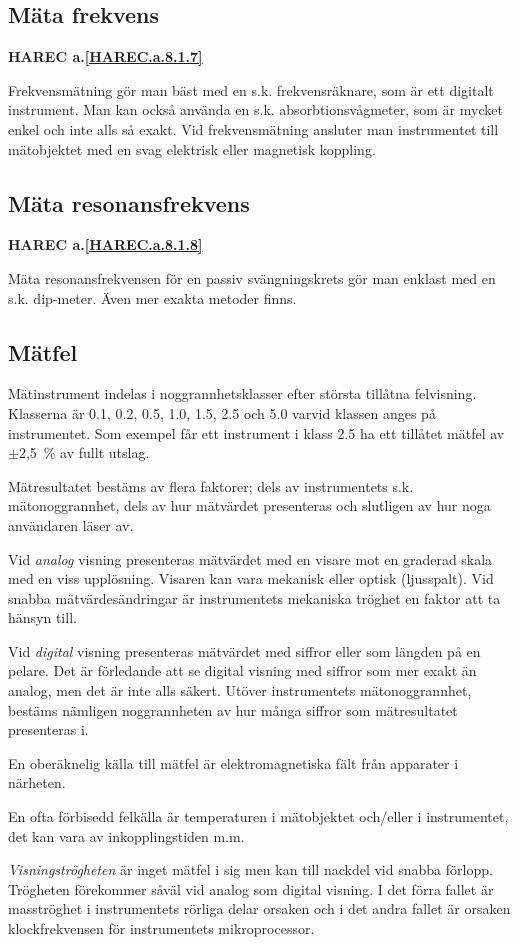 \subsection{Mäta frekvens}
\textbf{
HAREC a.\ref{HAREC.a.8.1.7}\label{myHAREC.a.8.1.7}
}

Frekvensmätning gör man bäst med en s.k. frekvensräknare, som är ett
digitalt instrument.  Man kan också använda en
s.k. absorbtionsvågmeter, som är mycket enkel och inte alls så exakt.
Vid frekvensmätning ansluter man instrumentet till mätobjektet med en
svag elektrisk eller magnetisk koppling.

\subsection{Mäta resonansfrekvens}
\textbf{
HAREC a.\ref{HAREC.a.8.1.8}\label{myHAREC.a.8.1.8}
}

Mäta resonansfrekvensen för en passiv svängningskrets gör man enklast
med en s.k. dip-meter. Även mer exakta metoder finns.


\subsection{Mätfel}

Mätinstrument indelas i noggrannhetsklasser efter största tillåtna
felvisning. Klasserna är 0.1, 0.2, 0.5, 1.0, 1.5, 2.5 och 5.0 varvid
klassen anges på instrumentet. Som exempel får ett instrument i klass
2.5 ha ett tillåtet mätfel av \(\pm\)2,5~\% av fullt utslag.

Mätresultatet bestäms av flera faktorer; dels av instrumentets
s.k. mätonoggrannhet, dels av hur mätvärdet presenteras och slutligen
av hur noga användaren läser av.

Vid \emph{analog} visning presenteras mätvärdet med en visare mot en
graderad skala med en viss upplösning. Visaren kan vara mekanisk eller
optisk (ljusspalt). Vid snabba mätvärdesändringar är instrumentets
mekaniska tröghet en faktor att ta hänsyn till.

Vid \emph{digital} visning presenteras mätvärdet med siffror eller som
längden på en pelare. Det är förledande att se digital visning med
siffror som mer exakt än analog, men det är inte alls säkert. Utöver
instrumentets mätonoggrannhet, bestäms nämligen noggrannheten av hur
många siffror som mätresultatet presenteras i.

En oberäknelig källa till mätfel är elektromagnetiska fält från
apparater i närheten.

En ofta förbisedd felkälla är temperaturen i mätobjektet och/eller i
instrumentet, det kan vara av inkopplingstiden m.m.

\emph{Visningströgheten} är inget mätfel i sig men kan till nackdel
vid snabba förlopp. Trögheten förekommer såväl vid analog som digital
visning. I det förra fallet är masströghet i instrumentets rörliga
delar orsaken och i det andra fallet är orsaken klockfrekvensen för
instrumentets mikroprocessor.
